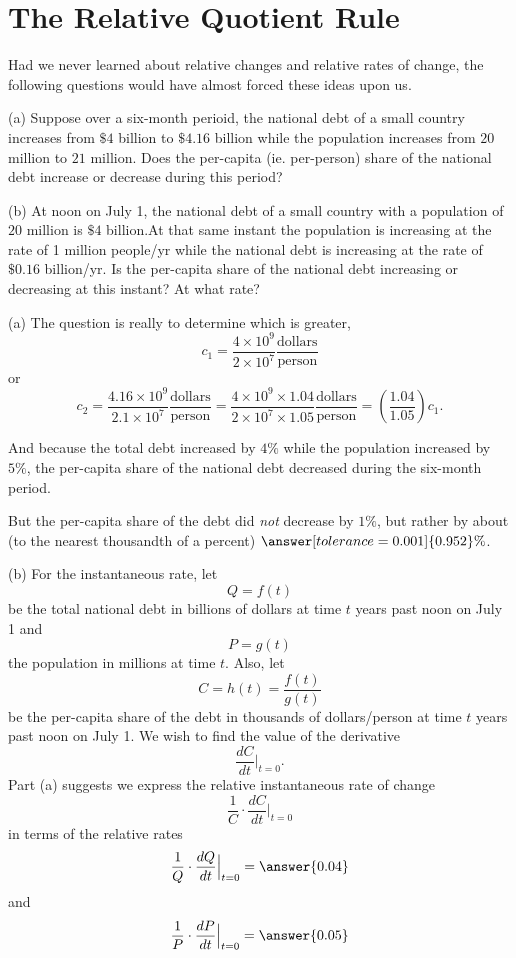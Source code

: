 \documentclass{ximera}
\begin{document}
\section*{The Relative Quotient Rule}
Had we never learned about relative changes and relative rates of change, the following questions would have almost forced these ideas upon us.

\begin{question} \label{Ex:Dfggt4ttggg}
(a) Suppose over a six-month perioid, the national debt of a small country increases from $\$4$ billion to $\$4.16$ billion while the population increases from $20$ million to $21$ million. Does the per-capita (ie. per-person) share of the national debt increase or decrease during this period? 

(b) At noon on July 1, the national debt of a small country with a population of $20$ million is $\$4$ billion.At that same instant the population is increasing at the rate of 1 million people/yr while the national debt is increasing at the rate of $\$0.16$ billion/yr. Is the per-capita share of the national debt increasing or decreasing at this instant? At what rate?

\begin{explanation}
(a) The question is really to determine which is greater, 
\[
       c_1 =  \frac{4 \times 10^9}{2 \times 10^7} \frac{\text{dollars}}{\text{person}}
\]
or
\[
      c_2 =   \frac{4.16 \times 10^9}{2.1 \times 10^7} \frac{\text{dollars}}{\text{person}} = \frac{4 \times 10^9 \times 1.04}{2 \times 10^7\times 1.05} \frac{\text{dollars}}{\text{person}} = \left( \frac{1.04}{1.05} \right)c_1 .
\]

And because the total debt increased by $4\%$ while the population increased by $5\%$, the per-capita share of the national debt decreased during the six-month period.

But the per-capita share of the debt did \emph{not} decrease by $1\%$, but rather by about (to the nearest thousandth of a percent) $\answer[tolerance=0.001]{0.952}\%$.

(b) For the instantaneous rate, let
\[
         Q = f(t)
\]
be the total national debt in billions of dollars at time $t$ years past noon on July 1 and
\[
     P = g(t)
\]
the population in millions at time $t$. Also, let
\[
       C = h(t) = \frac{f(t)}{g(t)}
\]
be the per-capita share of the debt in thousands of dollars/person at time $t$ years past noon on July 1. We wish to find the value of the derivative
\[
      \frac{dC}{dt} \Big|_{t=0} .
\]
Part (a) suggests we express the relative instantaneous rate of change
\[
     \frac{1}{C} \cdot \frac{dC}{dt} \Big|_{t=0}
\]
in terms of the relative rates
\[
    \frac{1}{Q} \cdot \frac{dQ}{dt}\Big|_{t=0} = \answer{0.04} 
\]
and
\[
   \frac{1}{P} \cdot \frac{dP}{dt}\Big|_{t=0} = \answer{0.05}
\]


\end{explanation}
\end{question}
\end{document}
